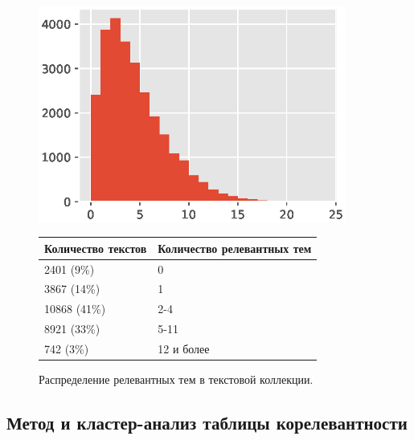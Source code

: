 \documentclass[12pt]{article}
\begin{document}
\begin{figure}
	\centering
	\caption{Распределение релевантных тем в текстовой коллекции.}
	\label{fig:relevant_counts}
	\begin{minipage}{0.45\textwidth}
		\centering
		\includegraphics[width=0.9\textwidth]{images/relevants_hist}
	\end{minipage}
	\begin{minipage}{0.45\textwidth}
		\centering
		\begin{tabular}{|p{}|p{}|}
			\hline 
			Количество текстов & Количество релевантных тем \\ 
			\hline 
			2401 (9\%)  & 0 \\ 
			3867 (14\%)   & 1 \\ 
			10868 (41\%)  & 2-4 \\ 
			8921 (33\%)   & 5-11 \\ 
			742 (3\%)    & 12 и более \\ 
			\hline 
		\end{tabular} 
	\end{minipage}
\end{figure}

\subsection{Метод и кластер-анализ таблицы корелевантности}
\end{document}
